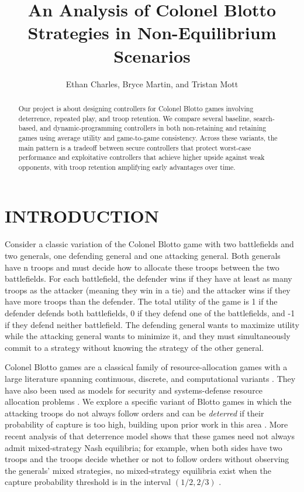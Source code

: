 \documentclass[letterpaper, 10 pt, conference]{ieeeconf}  %
\title{\LARGE \bf
An Analysis of Colonel Blotto Strategies in Non-Equilibrium Scenarios
}
\author{Ethan Charles, Bryce Martin, and Tristan Mott%
}
\begin{document}
\maketitle
\thispagestyle{empty}
\pagestyle{empty}


\begin{abstract}

Our project is about designing controllers for Colonel Blotto games involving deterrence, repeated play, and troop retention. We compare several baseline, search-based, and dynamic-programming controllers in both non-retaining and retaining games using average utility and game-to-game consistency. Across these variants, the main pattern is a tradeoff between secure controllers that protect worst-case performance and exploitative controllers that achieve higher upside against weak opponents, with troop retention amplifying early advantages over time.

\end{abstract}


\section{INTRODUCTION}

Consider a classic variation of the Colonel Blotto game with two battlefields and two generals, one defending general and one attacking general. Both generals have n troops and must decide how to allocate these troops between the two battlefields. For each battlefield, the defender wins if they have at least as many troops as the attacker (meaning they win in a tie) and the attacker wins if they have more troops than the defender. The total utility of the game is 1 if the defender defends both battlefields, 0 if they defend one of the battlefields, and -1 if they defend neither battlefield. The defending general wants to maximize utility while the attacking general wants to minimize it, and they must simultaneously commit to a strategy without knowing the strategy of the other general.

Colonel Blotto games are a classical family of resource-allocation games with a large literature spanning continuous, discrete, and computational variants \cite{borel1921theorie,gross1950continuous,roberson2006colonel,hart2008discrete,ahmadinejad2019duels}. They have also been used as models for security and systems-defense resource allocation problems \cite{shubik1981systems,pita2009using}. We explore a specific variant of Blotto games in which the attacking troops do not always follow orders and can be \emph{deterred} if their probability of capture is too high, building upon prior work in this area \cite{original_blotto_deterrence}. More recent analysis of that deterrence model shows that these games need not always admit mixed-strategy Nash equilibria; for example, when both sides have two troops and the troops decide whether or not to follow orders without observing the generals' mixed strategies, no mixed-strategy equilibria exist when the capture probability threshold is in the interval $(1/2, 2/3)$ \cite{info_structure_deterrence}.
\end{document}

